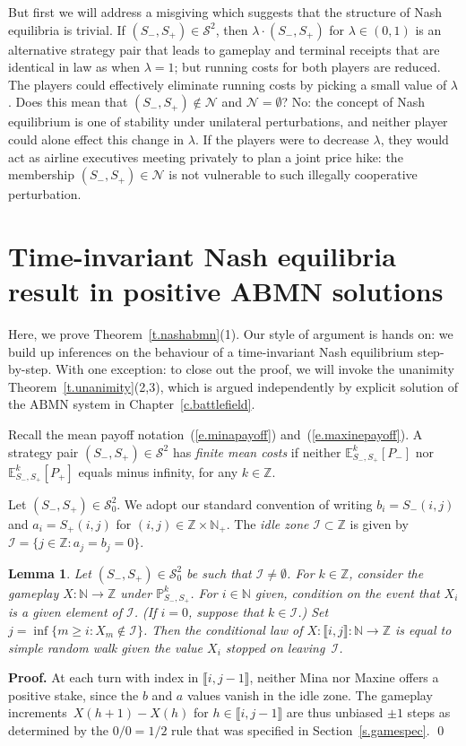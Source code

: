 \documentclass[letterpaper,11pt,oneside,reqno]{amsbook}
\newcommand{\PP}{\ensuremath{\mathbb{P}}}
\newcommand{\N}{\ensuremath{\mathbb{N}}}
\newcommand{\Z}{\ensuremath{\mathbb{Z}}}
\newcommand{\E}[0]{\mathbb{E}}
\numberwithin{figure}{chapter}
\newtheorem{lemma}[theorem]{Lemma}
\theoremstyle{definition}
\theoremstyle{definition}
\theoremstyle{definition}
\theoremstyle{definition}
\theoremstyle{definition}
\newcommand{\mc}{\mathcal}
\newcommand{\nwithzero}{\N}
\newcommand{\nwithoutzero}{\N_+}
\newcommand{\tis}{\mc{S}_0}
\newcommand\pgameplay[3]{\PP^{#3}_{#1,#2}}
\newcommand{\abmnmacspace}{\textrm{ABMN} }
\def\hfff#1{\label{#1}}
\begin{document}
 But first we will address a misgiving which suggests that the structure of Nash equilibria is trivial. If $(S_-,S_+) \in \mc{S}^2$, then $\lambda \cdot (S_-,S_+)$ for $\lambda \in (0,1)$
 is an alternative strategy pair that leads to gameplay and terminal receipts that are identical in law as when $\lambda =1$; but running costs for both players are reduced. The players could effectively eliminate running costs by picking a small value of $\lambda$. Does this mean that $(S_-,S_+) \not\in \mc{N}$ and $\mc{N} = \emptyset$? No: the concept of Nash equilibrium is one of stability under unilateral perturbations, and neither player could alone effect this change in $\lambda$. If the players were to decrease $\lambda$, they would act as airline executives meeting privately to plan a joint price hike: the membership $(S_-,S_+) \in \mc{N}$ is not vulnerable to such illegally cooperative perturbation.   


\section{Time-invariant Nash equilibria result in positive \abmnmacspace solutions}

Here, we prove Theorem~\ref{t.nashabmn}(1). Our style of argument is hands on: we build up inferences on the behaviour of a time-invariant Nash equilibrium step-by-step.
With one exception: to close out the proof, we will invoke the unanimity Theorem~\ref{t.unanimity}(2,3), which is argued independently by explicit solution of the $\abmnmacspace$ system in Chapter~\ref{c.battlefield}.

Recall the mean payoff notation~(\ref{e.minapayoff}) and~(\ref{e.maxinepayoff}).   A strategy pair $(S_-,S_+) \in \mc{S}^2$ has {\em finite mean costs} if neither $\E^k_{S_-,S_+}[P_-]$ nor $\E^k_{S_-,S_+}[P_+]$ equals minus infinity, for any $k \in \Z$. 

Let $(S_-,S_+) \in \tis^2$. 
We adopt our standard convention of writing $b_i = S_-(i,j)$ and  $a_i = S_+(i,j)$ for $(i,j) \in \Z \times \nwithoutzero$.
The {\em idle zone}\hfff{idle} $\mc{I} \subset \Z$ is given by $\mc{I} = \big\{ j \in \Z: a_j = b_j = 0 \big\}$. 
\begin{lemma}\label{l.idlezone}
Let  $(S_-,S_+) \in \tis^2$ be such that $\mc{I} \not= \emptyset$. For $k \in \Z$, consider the gameplay $X:\N \to \Z$ under 
$\pgameplay{S_-}{S_+}{k}$. For  $i \in \nwithzero$ given,
condition on the event that $X_i$ is a given element of $\mc{I}$.
(If $i = 0$, suppose that $k \in \mc{I}$.)  Set  $j = \inf \big\{ m  \geq i: X_m \not\in \mc{I} \big\}$. Then the conditional law of $X: \llbracket i,j\rrbracket: \nwithzero \to \Z$ is equal to simple random walk given the value $X_i$ stopped on leaving~$\mc{I}$.
\end{lemma}
{\bf Proof.} At each turn with index in $\llbracket i,j-1 \rrbracket$, neither Mina nor Maxine offers a positive stake, since the $b$ and $a$ values vanish in the idle zone.
The gameplay increments~$X(h+1) - X(h)$ for $h \in \llbracket i,j-1 \rrbracket$ are thus unbiased $\pm 1$ steps as determined by the $0/0 = 1/2$ rule that was specified in Section~\ref{s.gamespec}. \qed 
\end{document}
